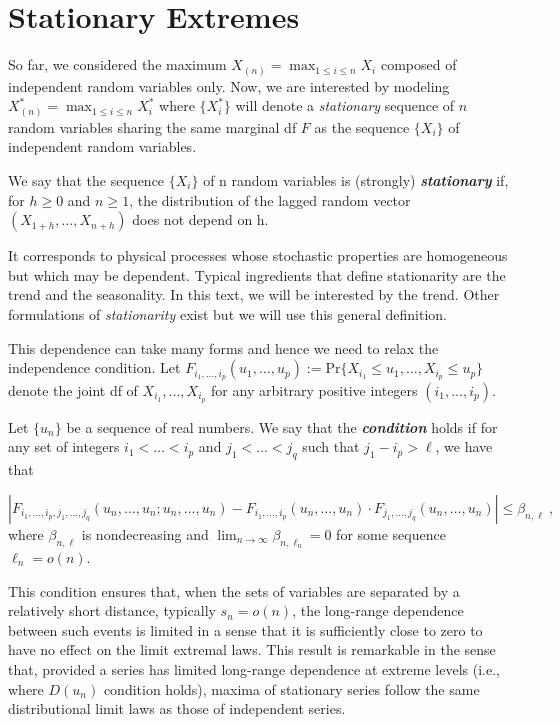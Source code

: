 \section{Stationary Extremes}\label{sec:statio}

So far, we considered the maximum $X_{(n)}=\max_{1\leq i\leq n}X_i$ composed of independent random variables only. 
 Now, we are interested by modeling 
$X^*_{(n)}=\max_{1\leq i\leq n}X^*_i$ where $\{X^*_i\}$ will denote a \emph{stationary} 
sequence of $n$ random variables sharing the same marginal df $F$ as the sequence $\{X_i\}$ of independent random variables.

\begin{definition} We say that the sequence $\{X_i\}$ of n random variables is (strongly) \emph{\textbf{stationary}} if, for $h\geq 0$ and $n\geq 1$, the distribution of the lagged random vector $(X_{1+h},\dots,X_{n+h})$ does not depend on h.
\end{definition}
It corresponds to physical processes whose stochastic properties are homogeneous but which may be dependent. Typical ingredients that define stationarity are the trend and the seasonality. In this text, we will be interested by the trend.  Other formulations of \emph{stationarity} exist but we will use this general definition.  

This dependence can take many forms and hence we need to relax the independence condition.
Let $F_{i_1,\dots,i_p}(u_1,\dots,u_p):=\text{Pr}\{X_{i_1}\leq 
u_1,\dots,X_{i_p}\leq u_p\}$ denote the joint df of 
$X_{i_1},\dots,X_{i_p}$ for any arbitrary positive integers $(i_1,\dots,i_p)$.

\begin{definition} 
	Let $\{u_n\}$ be a sequence of real numbers. We say that the \emph{  \textbf{condition}} holds if for any set of integers $i_1<\dots<i_p$ and $j_1<\dots<j_q$ such that $j_1-i_p>\ell$, we have that 
	
	\begin{equation}
	|F_{i_1,\dots,i_p,j_1,\dots,j_q}(u_n,\dots,u_n;u_n,\dots,u_n)-F_{i_1,\dots,i_p}(u_n,\dots,u_n)\cdot F_{j_1,\dots,j_q}(u_n,\dots, u_n)|\leq \beta_{n,\ell}\ ,
	\end{equation}
	where $\beta_{n,\ell}$ is nondecreasing and  $\displaystyle{\lim_{n \to \infty}}\beta_{n,\ell_n}=0$ for some sequence $\ell_n=o(n)$.
\end{definition}
This condition ensures that, when the sets of variables are separated by a relatively short distance, typically $s_n=o(n)$, the long-range dependence between such events is limited in a sense that it is sufficiently close to zero to have no effect on the limit extremal laws.
This result is remarkable in the sense that, provided a series has limited long-range dependence at extreme levels (i.e., where $D(u_n)$ condition holds), maxima of stationary series follow the same distributional limit laws as those of independent series.%


